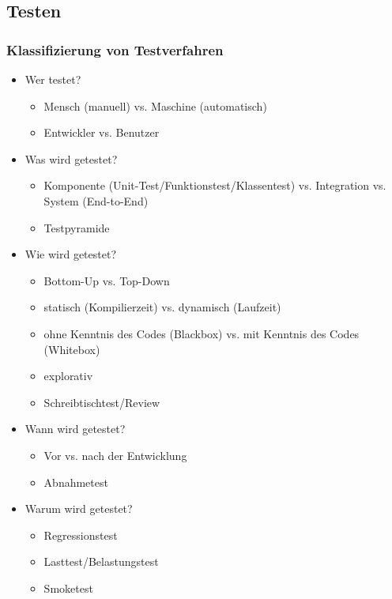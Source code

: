 \clearpage

\subsection{Testen}
\label{sec:Testen}

\subsubsection{Klassifizierung von Testverfahren}
\label{sec:KlassifizierungTestverfahren}

\begin{multicols}{2}
	\begin{itemize}
		\item Wer testet?
		\begin{itemize}
			\item Mensch (manuell) vs. Maschine (automatisch)
			\item Entwickler vs. Benutzer
		\end{itemize}
		\item Was wird getestet?
		\begin{itemize}
			\item Komponente (Unit-Test/Funktionstest/Klassentest) vs. Integration vs. System (End-to-End)
			\item Testpyramide
		\end{itemize}
		\item Wie wird getestet?
		\begin{itemize}
			\item Bottom-Up vs. Top-Down
			\item statisch (Kompilierzeit) vs. dynamisch (Laufzeit)
			\item ohne Kenntnis des Codes (Blackbox) vs. mit Kenntnis des Codes (Whitebox)
			\item explorativ
			\item Schreibtischtest/Review
		\end{itemize}
		\item Wann wird getestet?
		\begin{itemize}
			\item Vor vs. nach der Entwicklung
			\item Abnahmetest
		\end{itemize}
		\item Warum wird getestet?
		\begin{itemize}
			\item Regressionstest
			\item Lasttest/Belastungstest
			\item Smoketest
		\end{itemize}
	\end{itemize}
\end{multicols}
